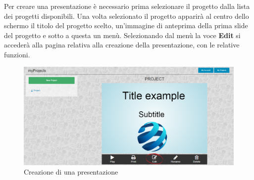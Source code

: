 Per creare una presentazione è necessario prima selezionare il progetto dalla lista dei progetti disponibili. Una volta selezionato il progetto apparirà al centro dello schermo il titolo del progetto scelto, un'immagine di anteprima della prima slide del progetto e sotto a questa un menù. Selezionando dal menù la voce \textbf{Edit} si accederà alla pagina relativa alla creazione della presentazione, con le relative funzioni.

\begin{figure}[H] 
	\centering 
	\includegraphics[scale=0.40] {img/presentazione.png}
	\caption{Creazione di una presentazione} 
\end{figure}